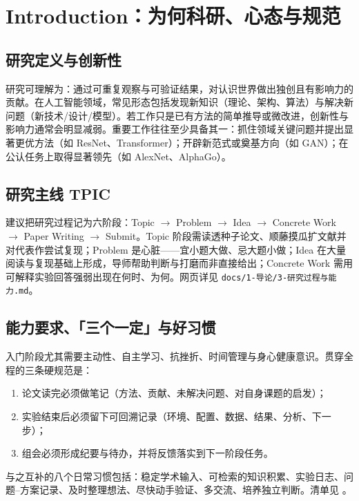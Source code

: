 \section{Introduction：为何科研、心态与规范}
\label{sec:intro}


\subsection{研究定义与创新性}
研究可理解为：通过可重复观察与可验证结果，对认识世界做出独创且有影响力的贡献。在人工智能领域，常见形态包括发现新知识（理论、架构、算法）与解决新问题（新技术/设计/模型）。若工作只是已有方法的简单推导或微改进，创新性与影响力通常会明显减弱。重要工作往往至少具备其一：抓住领域关键问题并提出显著更优方法（如 ResNet、Transformer）；开辟新范式或奠基方向（如 GAN）；在公认任务上取得显著领先（如 AlexNet、AlphaGo）。

\subsection{研究主线 TPIC}
建议把研究过程记为六阶段：Topic $\rightarrow$ Problem $\rightarrow$ Idea $\rightarrow$ Concrete Work $\rightarrow$ Paper Writing $\rightarrow$ Submit。Topic 阶段需读透种子论文、顺藤摸瓜扩文献并对代表作尝试复现；Problem 是心脏——宜小题大做、忌大题小做；Idea 在大量阅读与复现基础上形成，导师帮助判断与打磨而非直接给出；Concrete Work 需用可解释实验回答强弱出现在何时、为何。网页详见 \texttt{docs/1-导论/3-研究过程与能力.md}。

\subsection{能力要求、「三个一定」与好习惯}
入门阶段尤其需要主动性、自主学习、抗挫折、时间管理与身心健康意识。贯穿全程的三条硬规范是：
\begin{enumerate}
  \item 论文读完必须做笔记（方法、贡献、未解决问题、对自身课题的启发）；
  \item 实验结束后必须留下可回溯记录（环境、配置、数据、结果、分析、下一步）；
  \item 组会必须形成纪要与待办，并将反馈落实到下一阶段任务。
\end{enumerate}
与之互补的八个日常习惯包括：稳定学术输入、可检索的知识积累、实验日志、问题--方案记录、及时整理想法、尽快动手验证、多交流、培养独立判断。清单见 。


